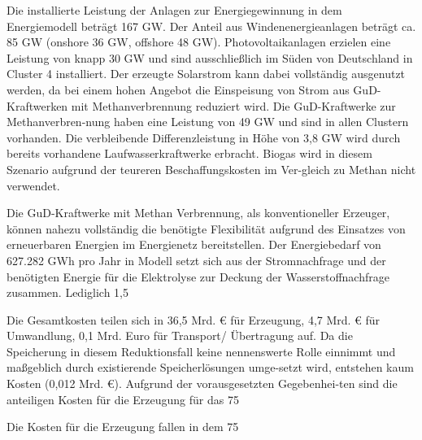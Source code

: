 Die installierte Leistung der Anlagen zur Energiegewinnung in dem Energiemodell beträgt 167 GW. Der Anteil aus Windenenergieanlagen beträgt ca. 85 GW (onshore 36 GW, offshore 48 GW). Photovoltaikanlagen erzielen eine Leistung von knapp 30 GW und sind ausschließlich im Süden von Deutschland in Cluster 4 installiert. Der erzeugte Solarstrom kann dabei vollständig ausgenutzt werden, da bei einem hohen Angebot die Einspeisung von Strom aus GuD-Kraftwerken mit Methanverbrennung reduziert wird. Die GuD-Kraftwerke zur Methanverbren-nung haben eine Leistung von 49 GW und sind in allen Clustern vorhanden. Die verbleibende Differenzleistung in Höhe von 3,8 GW wird durch bereits vorhandene Laufwasserkraftwerke erbracht. Biogas wird in diesem Szenario aufgrund der teureren Beschaffungskosten im Ver-gleich zu Methan nicht verwendet. 

Die GuD-Kraftwerke mit Methan Verbrennung, als konventioneller Erzeuger, können nahezu vollständig die benötigte Flexibilität aufgrund des Einsatzes von erneuerbaren Energien im Energienetz bereitstellen. Der Energiebedarf von 627.282 GWh pro Jahr in Modell setzt sich aus der Stromnachfrage und der benötigten Energie für die Elektrolyse zur Deckung der Wasserstoffnachfrage zusammen. Lediglich 1,5 %

Die Gesamtkosten teilen sich in 36,5 Mrd. € für Erzeugung, 4,7 Mrd. € für Umwandlung, 0,1 Mrd. Euro für Transport/ Übertragung auf. Da die Speicherung in diesem Reduktionsfall keine nennenswerte Rolle einnimmt und maßgeblich durch existierende Speicherlösungen umge-setzt wird, entstehen kaum Kosten (0,012 Mrd. €). Aufgrund der vorausgesetzten Gegebenhei-ten sind die anteiligen Kosten für die Erzeugung für das 75 %

Die Kosten für die Erzeugung fallen in dem 75 %

